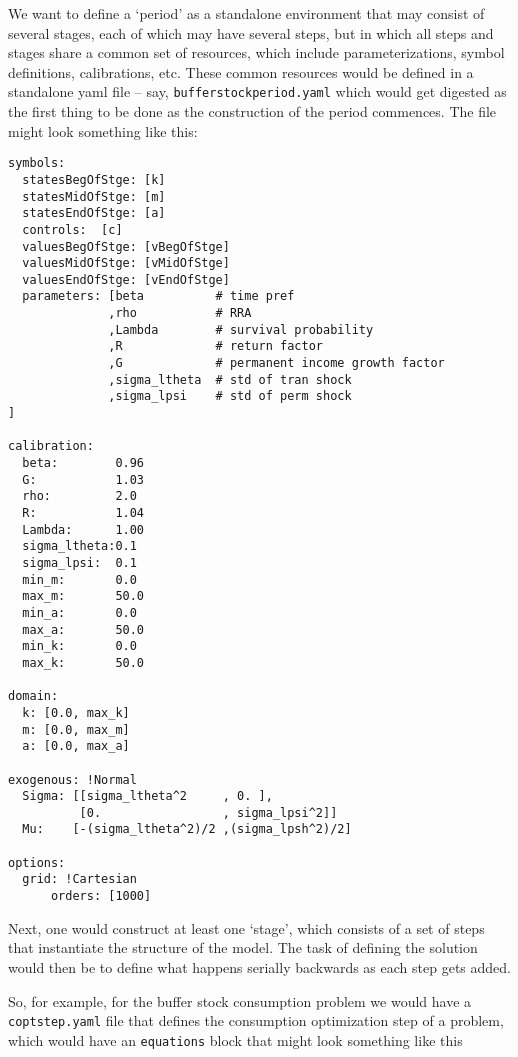 \documentclass[SolvingMicroDSOPs]{subfiles}
\begin{document}
We want to define a `period' as a standalone environment that may consist of several stages, each of which may have several steps, but in which all steps and stages share a common set of resources, which include parameterizations, symbol definitions, calibrations, etc.  These common resources would be defined in a standalone yaml file -- say, \texttt{bufferstockperiod.yaml} which would get digested as the first thing to be done as the construction of the period commences.  The file might look something like this:

\begin{verbatim}
symbols:
  statesBegOfStge: [k]
  statesMidOfStge: [m]
  statesEndOfStge: [a]
  controls:  [c]
  valuesBegOfStge: [vBegOfStge]
  valuesMidOfStge: [vMidOfStge]
  valuesEndOfStge: [vEndOfStge]
  parameters: [beta          # time pref
              ,rho           # RRA
              ,Lambda        # survival probability
              ,R             # return factor
              ,G             # permanent income growth factor 
              ,sigma_ltheta  # std of tran shock
              ,sigma_lpsi    # std of perm shock 
]

calibration:
  beta:        0.96
  G:           1.03
  rho:         2.0
  R:           1.04
  Lambda:      1.00
  sigma_ltheta:0.1
  sigma_lpsi:  0.1
  min_m:       0.0
  max_m:       50.0
  min_a:       0.0
  max_a:       50.0
  min_k:       0.0
  max_k:       50.0

domain:
  k: [0.0, max_k]
  m: [0.0, max_m]
  a: [0.0, max_a]

exogenous: !Normal
  Sigma: [[sigma_ltheta^2     , 0. ],
          [0.                 , sigma_lpsi^2]]
  Mu:    [-(sigma_ltheta^2)/2 ,(sigma_lpsh^2)/2]

options:
  grid: !Cartesian
      orders: [1000]
\end{verbatim}

Next, one would construct at least one `stage', which consists of a set of steps that instantiate the structure of the model.  The task of defining the solution would then be to define what happens serially backwards as each step gets added.

So, for example, for the buffer stock consumption problem we would have a \texttt{coptstep.yaml} file that defines the consumption optimization step of a problem, which would have an \texttt{equations} block that might look something like this
\end{document}
